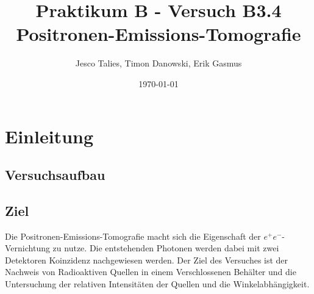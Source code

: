 \documentclass{article}
\begin{document}
    \title{Praktikum B - Versuch B3.4 Positronen-Emissions-Tomografie}
    \date{\today}
    \author{Jesco Talies, Timon Danowski, Erik Gasmus}
    \maketitle
    \newpage

    \tableofcontents
    \newpage
    
    \section{Einleitung}
        \subsection{Versuchsaufbau}

        \subsection{Ziel}
        Die Positronen-Emissions-Tomografie macht sich die Eigenschaft der $e^+e^-$-Vernichtung zu nutze. Die entstehenden Photonen werden dabei mit zwei Detektoren Koinzidenz nachgewiesen werden.
        Der Ziel des Versuches ist der Nachweis von Radioaktiven Quellen in einem Verschlossenen Behälter und die Untersuchung der relativen Intensitäten der Quellen und die Winkelabhängigkeit.
\end{document}
